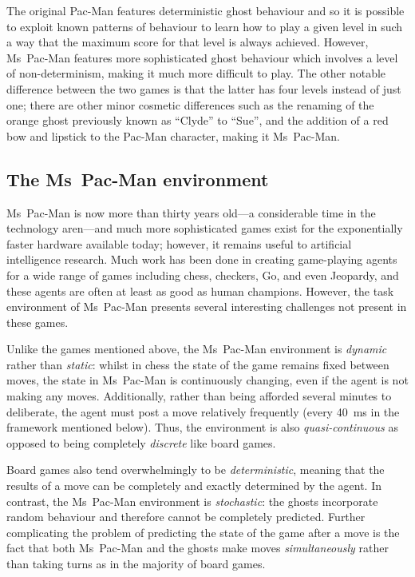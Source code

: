 The original Pac-Man features deterministic ghost behaviour and so it is possible to exploit known patterns of behaviour to learn how to play a given level in such a way that the maximum score for that level is always achieved.  However, Ms~Pac-Man features more sophisticated ghost behaviour which involves a level of non-determinism, making it much more difficult to play.  The other notable difference between the two games is that the latter has four levels instead of just one; there are other minor cosmetic differences such as the renaming of the orange ghost previously known as ``Clyde'' to ``Sue'', and the addition of a red bow and lipstick to the Pac-Man character, making it Ms~Pac-Man.

\subsection{The Ms~Pac-Man environment}

Ms~Pac-Man is now more than thirty years old---a considerable time in the technology aren---and much more sophisticated games exist for the exponentially faster hardware available today; however, it remains useful to artificial intelligence research.  Much work has been done in creating game-playing agents for a wide range of games including chess, checkers, Go, and even Jeopardy, and these agents are often at least as good as human champions.  However, the task environment \cite[pp. 42--44]{RussellNorvig} of Ms~Pac-Man presents several interesting challenges not present in these games.

Unlike the games mentioned above, the Ms~Pac-Man environment is \emph{dynamic} rather than \emph{static}: whilst in chess the state of the game remains fixed between moves, the state in Ms~Pac-Man is continuously changing, even if the agent is not making any moves.  Additionally, rather than being afforded several minutes to deliberate, the agent must post a move relatively frequently (every 40~ms in the framework mentioned below).  Thus, the environment is also \emph{quasi-continuous} as opposed to being completely \emph{discrete} like board games.

Board games also tend overwhelmingly to be \emph{deterministic}, meaning that the results of a move can be completely and exactly determined by the agent.  In contrast, the Ms~Pac-Man environment is \emph{stochastic}: the ghosts incorporate random behaviour and therefore cannot be completely predicted.  Further complicating the problem of predicting the state of the game after a move is the fact that both Ms~Pac-Man and the ghosts make moves \emph{simultaneously} rather than taking turns as in the majority of board games.

